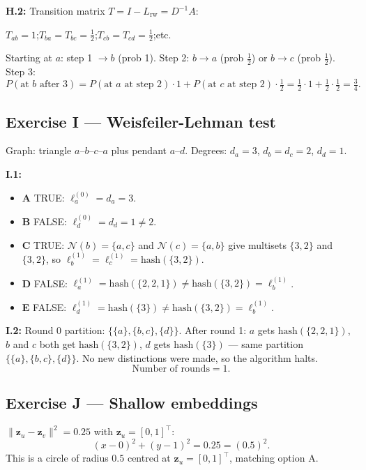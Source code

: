 \documentclass[12pt,a4paper]{article}
\newcommand{\ans}[1]{\tcbox[colback=yellow!20,colframe=orange!60,size=small]{\textbf{#1}}}
\begin{document}
\textbf{H.2:} Transition matrix $T=I-L_{\mathrm{rw}}=D^{-1}A$:
\begin{center}
$T_{ab}=1$;\quad $T_{ba}=T_{bc}=\tfrac{1}{2}$;\quad $T_{cb}=T_{cd}=\tfrac{1}{2}$;\quad etc.
\end{center}
Starting at $a$: step 1 $\to b$ (prob 1). Step 2: $b\to a$ (prob $\frac12$) or $b\to c$ (prob $\frac12$).
Step 3:
\[
  P(\text{at }b\text{ after 3}) = P(\text{at }a\text{ at step 2})\cdot 1
                                 + P(\text{at }c\text{ at step 2})\cdot\tfrac{1}{2}
  = \tfrac{1}{2}\cdot 1 + \tfrac{1}{2}\cdot\tfrac{1}{2}=\boxed{\tfrac{3}{4}}.
\]

\subsection*{Exercise I --- Weisfeiler-Lehman test}

Graph: triangle $a$--$b$--$c$--$a$ plus pendant $a$--$d$.
Degrees: $d_a=3$, $d_b=d_c=2$, $d_d=1$.

\textbf{I.1:}
\begin{itemize}[noitemsep]
  \item \textbf{A} TRUE: $\ell^{(0)}_a=d_a=3$.
  \item \textbf{B} FALSE: $\ell^{(0)}_d=d_d=1\neq 2$.
  \item \textbf{C} TRUE: $\mathcal{N}(b)=\{a,c\}$ and $\mathcal{N}(c)=\{a,b\}$ give multisets $\{3,2\}$ and $\{3,2\}$, so $\ell^{(1)}_b=\ell^{(1)}_c=\mathrm{hash}(\{3,2\})$.
  \item \textbf{D} FALSE: $\ell^{(1)}_a=\mathrm{hash}(\{2,2,1\})\neq\mathrm{hash}(\{3,2\})=\ell^{(1)}_b$.
  \item \textbf{E} FALSE: $\ell^{(1)}_d=\mathrm{hash}(\{3\})\neq\mathrm{hash}(\{3,2\})=\ell^{(1)}_b$.
\end{itemize}
\ans{True: A, C}

\textbf{I.2:} Round 0 partition: $\{\{a\},\{b,c\},\{d\}\}$. After round 1: $a$ gets $\mathrm{hash}(\{2,2,1\})$, $b$ and $c$ both get $\mathrm{hash}(\{3,2\})$, $d$ gets $\mathrm{hash}(\{3\})$ --- same partition $\{\{a\},\{b,c\},\{d\}\}$.  No new distinctions were made, so the algorithm halts.
\[
  \boxed{\text{Number of rounds} = 1.}
\]

\subsection*{Exercise J --- Shallow embeddings \hfill \ans{Answer: A}}

$\|\mathbf{z}_u-\mathbf{z}_v\|^2=0.25$ with $\mathbf{z}_u=[0,1]^\top$:
\[
  (x-0)^2+(y-1)^2=0.25=(0.5)^2.
\]
This is a circle of radius $0.5$ centred at $\mathbf{z}_u=[0,1]^\top$, matching option A.
\end{document}
